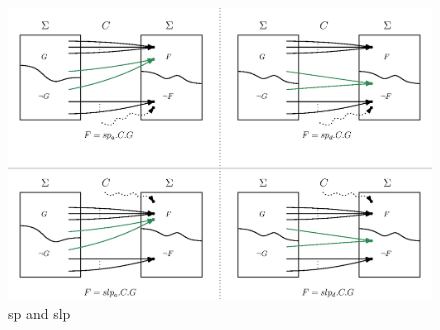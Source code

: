 \begin{figure}[ht!]\centering
\includegraphics[width=\textwidth]{image/sp-slp.eps}
\caption{sp and slp}
\label{fig:sp-slp}
\end{figure}


